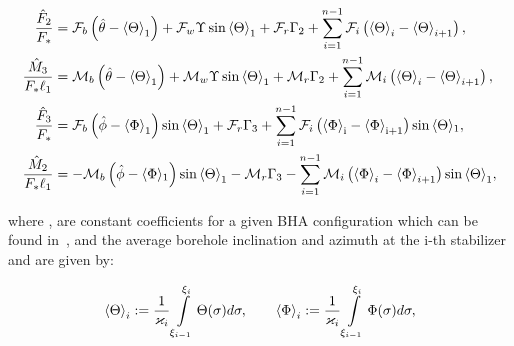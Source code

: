 \begin{align}
	\frac{{{{\hat F}_2}}}{{{F_*}}} &= {\mathcal{F}_b}\left( {\hat \theta  - {{\rm{\langle\Theta }}\rangle}_1} \right)+{\mathcal{F}_w}\Upsilon \sin {{\rm{\langle\Theta\rangle }}_1} + {\mathcal{F}_r}{\Gamma _2} + \mathop \sum \limits_{i = 1}^{n - 1} {\mathcal{F}_i}\left( {{{\rm{\langle\Theta\rangle }}_i} - {{\rm{\langle\Theta\rangle }}_{i + 1}}} \right),
	\nonumber \\
	\frac{{{{\hat M}_3}}}{{{F_*}{\ell _1}}} &= {\mathcal{M}_b}\left( {\hat \theta  - {{\rm{\langle\Theta\rangle }}_1}} \right) + {\mathcal{M}_w}\Upsilon \sin {{\rm{\langle\Theta\rangle }}_1} + {\mathcal{M}_r}{\Gamma _2} + \mathop \sum \limits_{i = 1}^{n - 1} {\mathcal{M}_i}\left( {{{\rm{\langle\Theta\rangle }}_i} - {{\rm{\langle\Theta\rangle }}_{i + 1}}} \right),
	\nonumber \\
	\frac{{{{\hat F}_3}}}{{{F_*}}} &= {\mathcal{F}_b}\left( {\hat \phi  - {\langle\Phi \rangle}_1} \right)\sin {{\rm{\langle\Theta\rangle }}_1} + {\mathcal{F}_r}{\Gamma _3} + \mathop \sum \limits_{i = 1}^{n - 1} {\mathcal{F}_i}\left( {{{\rm{\langle\Phi\rangle }}_{\rm{i}}} - {{\rm{\langle\Phi\rangle }}_{{\rm{i}} + 1}}} \right)\sin {{\rm{\langle\Theta }}\rangle_1},
	\nonumber \\
	\frac{{{{\hat M}_2}}}{{{F_*}{\ell _1}}} &=  - {\mathcal{M}_b}\left( {\hat \phi  - \langle{\Phi }\rangle_1} \right)\sin {{\rm{\langle\Theta\rangle }}_1} - {\mathcal{M}_r}{\Gamma _3} - \mathop \sum \limits_{i = 1}^{n - 1} {\mathcal{M}_i}\left( {{{\rm{\langle\Phi\rangle }}_i} - {{\rm{\langle\Phi\rangle }}_{i + 1}}} \right)\sin {{\rm{\langle\Theta\rangle }}_1},
	\label{eq:BHAforcemomentequations}
\end{align}

where ,  are constant coefficients for a given BHA configuration which can be found in~\cite{Monsieurs2015}, and the average borehole inclination and azimuth at the i-th stabilizer  and  are given by:

\begin{equation}
	{{\rm{\langle\Theta\rangle }}_i}:= \frac{1}{\varkappa_i}\int \limits_{\xi_{i-1}}^{\xi_i} \Theta(\sigma)d\sigma, \qquad
	{{\rm{\langle\Phi\rangle }}_i}:=\frac{1}{\varkappa_i}\int \limits_{\xi_{i-1}}^{\xi_i} \Phi(\sigma)d\sigma
	\label{eq:definitionaveragestates},
\end{equation}

